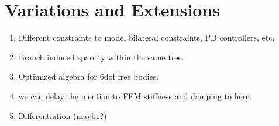 \section{Variations and Extensions}
\label{sec:variations_and_extensions}

\begin{enumerate}
    \item Different constraints to model bilateral constraints, PD controllers, etc.
    \item Branch induced sparsity within the same tree.
    \item Optimized algebra for 6dof free bodies.
    \item we can delay the mention to FEM stiffness and damping to here.
    \item Differentiation (maybe?)    
\end{enumerate}